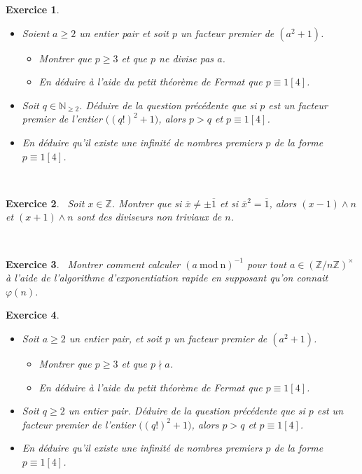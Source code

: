 \documentclass[11pt,a4paper]{article}
\newtheorem{ex}{Exercice}
\newcommand{\N}{\mathbb{N}}
\newcommand{\Z}{\mathbb{Z}}
\begin{document}
\begin{ex}\label{exemple_Dirichlet} \
\begin{itemize}
\item[$1.$] Soient $ a \geqslant 2 $ un entier pair  et soit $p$ un facteur premier de $(a^2+1)$.
\begin{itemize}
\item[$a)$] Montrer que $p \geqslant 3$ et que $p$ ne divise pas $a$.
\item[$b)$] En déduire à l'aide du petit théorème de Fermat que ${p}\equiv {1}[{4}] $.
\end{itemize} 
\item[$2.$] Soit $q\in \N_{\geq 2}$. Déduire de la question précédente que si $p$ est un facteur premier de l'entier $\big( (q!)^2+1  \big) $, alors $p>q$ et $p \equiv 1 [4]$.
\item[$3.$] En déduire qu'il existe une infinité de nombres premiers $p$ de la forme $p \equiv 1 [4]$.
\end{itemize}
\end{ex}



\

\begin{ex}\
Soit $x\in \Z$. Montrer que si $\overline{x}\neq \pm\overline{1}$ et si $\overline{x}^2=\overline{1}$, alors $(x-1)\wedge n$ et $(x+1)\wedge n$ sont des diviseurs non triviaux de $n$.
\end{ex}




\



\begin{ex}\
Montrer comment calculer $(a\mathrm{\ mod\ n})^{-1}$ pour tout $ a \in ( \mathbb{Z}/n \mathbb{Z})^{\times}$ à l'aide de l'algorithme d'exponentiation rapide en supposant qu'on connait $\varphi(n)$.
\end{ex}





\begin{ex} \
\begin{itemize}
\item[$1.$] Soit $ a \geqslant 2 $ un entier pair, et soit $p$ un facteur premier de $(a^2+1)$.
\begin{itemize}
\item[$a)$] Montrer que $p \geqslant 3$ et que $p \nmid a$.
\item[$b)$] En déduire à l'aide du petit théorème de Fermat que ${p}\equiv {1}[{4}] $.
\end{itemize} 
\item[$2.$] Soit $q \geqslant 2$ un entier pair. Déduire de la question précédente que si $p$ est un facteur premier de l'entier $\big( (q!)^2+1  \big) $, alors $p>q$ et $p \equiv 1 [4]$.
\item[$3.$] En déduire qu'il existe une infinité de nombres premiers $p$ de la forme $p \equiv 1 [4]$.
\end{itemize}
\end{ex}
\end{document}
